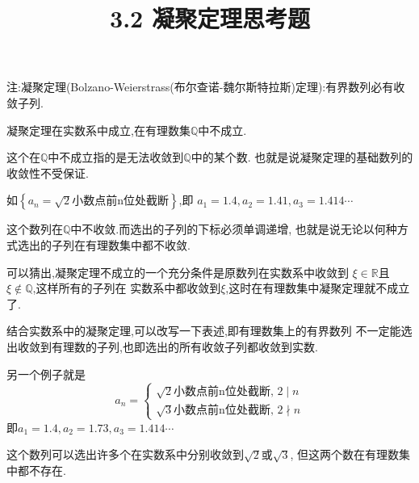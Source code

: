 \documentclass[windows,list,answers]{BHCexam}
\begin{document}
\everymath{\displaystyle}
\title{3.2 凝聚定理\quad 思考题}

\maketitle

注:凝聚定理(Bolzano-Weierstrass(布尔查诺-魏尔斯特拉斯)定理):有界数列必有收敛子列.

\begin{questions}
    \question
    凝聚定理在实数系中成立,在有理数集$\mathbb{Q} $中不成立.
    \begin{solution}{1cm}
        \methodonly
        这个在$\mathbb{Q}$中不成立指的是无法收敛到$\mathbb{Q}$中的某个数.
        也就是说凝聚定理的基础数列的收敛性不受保证.
        
        如$\left\{a_n=\sqrt{2}\text{小数点前n位处截断}\right\}$,即
        $a_1=1.4,a_2=1.41,a_3=1.414\cdots$

        这个数列在$\mathbb{Q}$中不收敛.而选出的子列的下标必须单调递增,
        也就是说无论以何种方式选出的子列在有理数集中都不收敛.

        可以猜出,凝聚定理不成立的一个充分条件是原数列在实数系中收敛到
        $\xi\in\mathbb{R}$且$\xi\notin\mathbb{Q}$,这样所有的子列在
        实数系中都收敛到$\xi$,这时在有理数集中凝聚定理就不成立了.

        结合实数系中的凝聚定理,可以改写一下表述,即有理数集上的有界数列
        不一定能选出收敛到有理数的子列,也即选出的所有收敛子列都收敛到实数.

        另一个例子就是
        \[a_n=\begin{cases}
            \sqrt{2}\text{小数点前n位处截断},\, 2\mid  n\\
            \sqrt{3}\text{小数点前n位处截断},\, 2\nmid n
        \end{cases}\]
        即$a_1=1.4,a_2=1.73,a_3=1.414\cdots$

        这个数列可以选出许多个在实数系中分别收敛到$\sqrt{2}$或$\sqrt{3}$,
        但这两个数在有理数集中都不存在.
    \end{solution}
    
\end{questions}
\end{document}
